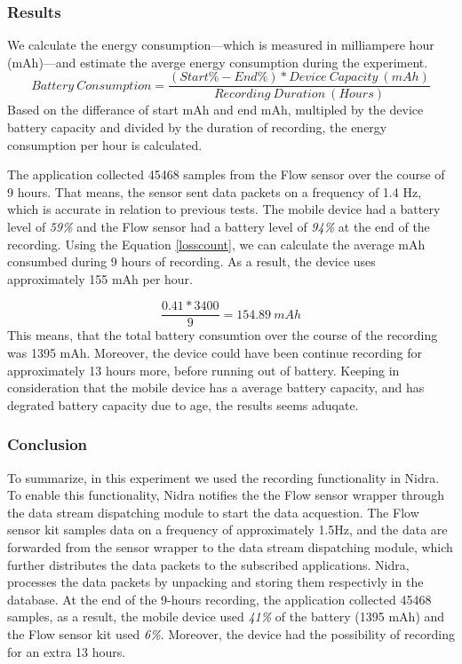 \subsubsection{Results}

We calculate the energy consumption---which is measured in milliampere hour (mAh)---and estimate the averge energy consumption during the experiment. 
\begin{equation} \label{losscount}
Battery\ Consumption = \frac{(Start\% - End\%) * Device\ Capacity\ (mAh)}{Recording\ Duration\ (Hours)}
\end{equation}
Based on the differance of start mAh and end mAh, multipled by the device battery capacity and divided by the duration of recording, the energy consumption per hour is calculated. 

The application collected 45468 samples from the Flow sensor over the course of 9 hours. That means, the sensor sent data packets on a frequency of 1.4 Hz, which is accurate in relation to previous tests. The mobile device had a battery level of \textit{59\%} and the Flow sensor had a battery level of \textit{94\%} at the end of the recording. Using the Equation \ref{losscount}, we can calculate the average mAh consumbed during 9 hours of recording. As a result, the device uses approximately 155 mAh per hour. 

\begin{equation}
\frac{0.41 * 3400}{9} = 154.89\ mAh
\end{equation}
This means, that the total battery consumtion over the course of the recording was 1395 mAh. Moreover, the device could have been continue recording for approximately 13 hours more, before running out of battery. Keeping in consideration that the mobile device has a average battery capacity, and has degrated battery capacity due to age, the results seems aduqate. 

\subsubsection{Conclusion}
To summarize, in this experiment we used the recording functionality in Nidra. To enable this functionality, Nidra notifies the the Flow sensor wrapper through the data stream dispatching module to start the data acquestion. The Flow sensor kit samples data on a frequency of approximately 1.5Hz, and the data are forwarded from the sensor wrapper to the data stream dispatching module, which further distributes the data packets to the subscribed applications. Nidra, processes the data packets by unpacking and storing them respectivly in the database. At the end of the 9-hours recording, the application collected 45468 samples, as a result, the mobile device used \textit{41\%} of the battery (1395 mAh) and the Flow sensor kit used \textit{6\%}. Moreover, the device had the possibility of recording for an extra 13 hours.

